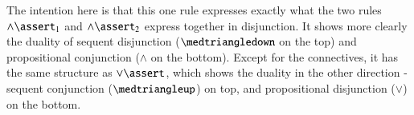 
The intention here is that this one rule expresses exactly what the
two rules \(\land\linfer_1\) and \(\land\linfer_2\) express together in
disjunction. It shows more clearly the duality of sequent disjunction
(\(\medtriangledown\) on the top) and propositional conjunction
(\(\land\) on the bottom). Except for the connectives, it has the same
structure as \(\lor\linfer\), which shows the duality in the other
direction - sequent conjunction (\(\medtriangleup\)) on top, and
propositional disjunction (\(\lor\)) on the bottom.

